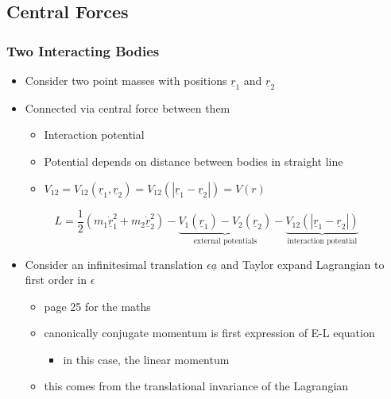 \documentclass[a4paper,11pt,normalem]{article}
\begin{document}
\section{}\label{lecture-8}

\subsection{Central Forces}\label{central-forces}

\subsubsection{Two Interacting Bodies}\label{two-interacting-bodies}

\begin{itemize}
\item
  Consider two point masses with positions \(\underline{r}_1\) and
  \(\underline{r}_2\)
\item
  Connected via central force between them
  \begin{itemize}
  \item
    Interaction potential
  \item
    Potential depends on distance between bodies in straight line
  \item
    \(V_12 = V_{12}(\underline{r}_1,\underline{r}_2) = V_{12}(|\underline{r}_1 - \underline{r}_2|) = V(r)\)
  \end{itemize}
\end{itemize}

\[
    L = \frac{1}{2}(m_1 \dot{\underline{r}}_{1}^2 + m_2 \dot{\underline{r}}_{2}^2) - \underbrace{V_1(\underline{r}_1) - V_2(\underline{r}_2)}_{\text{external potentials}} - \underbrace{V_{12}(|\underline{r}_1 - \underline{r}_2|)}_{\text{interaction potential}}
\]

\begin{itemize}
\item
  Consider an infinitesimal translation \(\epsilon\underline{a}\) and
  Taylor expand Lagrangian to first order in \(\epsilon\)
  \begin{itemize}
  \item
    page 25 for the maths
  \item
    canonically conjugate momentum is first expression of E-L equation
    \begin{itemize}
    \item
      in this case, the linear momentum
    \end{itemize}
  \item
    this comes from the translational invariance of the Lagrangian
  \end{itemize}
\end{itemize}
\end{document}
